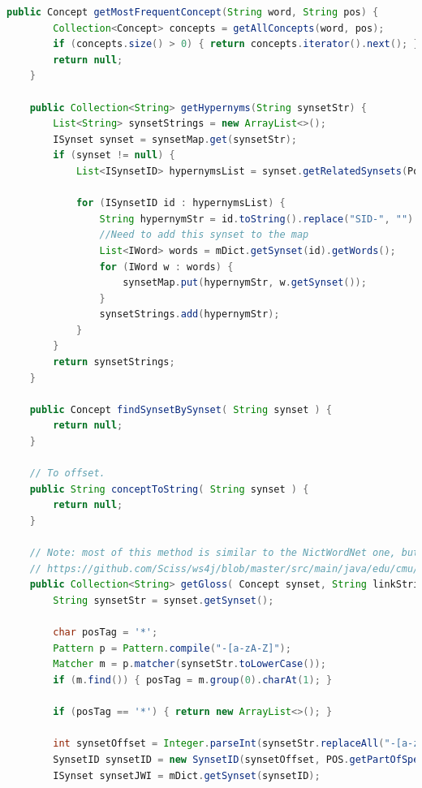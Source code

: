 \documentclass[11pt]{article}
\begin{document}
\begin{lstlisting}[language=Java]
    public Concept getMostFrequentConcept(String word, String pos) {
        Collection<Concept> concepts = getAllConcepts(word, pos);
        if (concepts.size() > 0) { return concepts.iterator().next(); }
        return null;
    }

    public Collection<String> getHypernyms(String synsetStr) {
        List<String> synsetStrings = new ArrayList<>();
        ISynset synset = synsetMap.get(synsetStr);
        if (synset != null) {
            List<ISynsetID> hypernymsList = synset.getRelatedSynsets(Pointer.HYPERNYM);

            for (ISynsetID id : hypernymsList) {
                String hypernymStr = id.toString().replace("SID-", "").toLowerCase();
                //Need to add this synset to the map
                List<IWord> words = mDict.getSynset(id).getWords();
                for (IWord w : words) {
                    synsetMap.put(hypernymStr, w.getSynset());
                }
                synsetStrings.add(hypernymStr);
            }
        }
        return synsetStrings;
    }

    public Concept findSynsetBySynset( String synset ) {
        return null;
    }

    // To offset.
    public String conceptToString( String synset ) {
        return null;
    }

    // Note: most of this method is similar to the NictWordNet one, but using JWI instead
    // https://github.com/Sciss/ws4j/blob/master/src/main/java/edu/cmu/lti/lexical_db/NictWordNet.java
    public Collection<String> getGloss( Concept synset, String linkString ) {
        String synsetStr = synset.getSynset();

        char posTag = '*';
        Pattern p = Pattern.compile("-[a-zA-Z]");
        Matcher m = p.matcher(synsetStr.toLowerCase());
        if (m.find()) { posTag = m.group(0).charAt(1); }

        if (posTag == '*') { return new ArrayList<>(); }

        int synsetOffset = Integer.parseInt(synsetStr.replaceAll("-[a-zA-Z]", ""));
        SynsetID synsetID = new SynsetID(synsetOffset, POS.getPartOfSpeech(posTag));
        ISynset synsetJWI = mDict.getSynset(synsetID);


\end{lstlisting}
\end{document}
